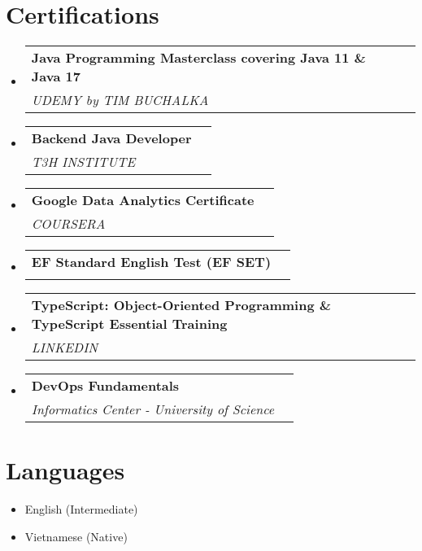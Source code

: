 \documentclass[letterpaper,11pt]{article}
\makeatletter
\newcommand{\resumeItem}[1]{
  \item\small{
    {#1 \vspace{-2pt}}
  }
}
\newcommand{\resumeSubheading}[4]{
  \vspace{-2pt}\item
    \begin{tabular*}{0.97\textwidth}[t]{l@{\extracolsep{\fill}}r}
      \textbf{#1} & #2 \\
      \textit{\small#3} & \textit{\small #4} \\
    \end{tabular*}\vspace{-7pt}
}
\newcommand{\resumeSubHeadingListStart}{\begin{itemize}[leftmargin=0.15in, label={}]}
\newcommand{\resumeSubHeadingListEnd}{\end{itemize}}
\newcommand{\resumeItemListStart}{\begin{itemize}}
\newcommand{\resumeItemListEnd}{\end{itemize}\vspace{-5pt}}
\makeatother
\begin{document}
\section{Certifications}
  \resumeSubHeadingListStart
    \resumeSubheading
      {Java Programming Masterclass covering Java 11 \& Java 17}{}
      {UDEMY by TIM BUCHALKA}{}
    \resumeSubheading
      {Backend Java Developer}{}
      {T3H INSTITUTE}{}
    \resumeSubheading
      {Google Data Analytics Certificate}{}
      {COURSERA}{}
    \resumeSubheading
      {EF Standard English Test (EF SET)}{}
      {}{}
    \resumeSubheading
      {TypeScript: Object-Oriented Programming \& TypeScript Essential Training}{}
      {LINKEDIN}{}
    \resumeSubheading
      {DevOps Fundamentals}{}
      {Informatics Center - University of Science}{}
  \resumeSubHeadingListEnd

\section{Languages}
  \resumeItemListStart
    \resumeItem{English (Intermediate)}
    \resumeItem{Vietnamese (Native)}
  \resumeItemListEnd

\end{document}
